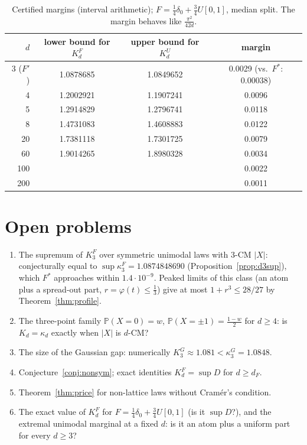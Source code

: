 \documentclass[11pt]{amsart}
\theoremstyle{definition}\newtheorem{definition}[theorem]{Definition}\theoremstyle{remark}\newtheorem{remark}[theorem]{Remark}
\begin{document}
\begin{table}[ht]\centering\small
\begin{tabular}{rccc}\toprule
$d$ & lower bound for $K_d^F$ & upper bound for $K_d^U$ & margin\\\midrule
3 ($F'$) & 1.0878685 & 1.0849652 & 0.0029 (vs.\ $F^*$: 0.00038)\\
4 & 1.2002921 & 1.1907241 & 0.0096\\
5 & 1.2914829 & 1.2796741 & 0.0118\\
8 & 1.4731083 & 1.4608883 & 0.0122\\
20 & 1.7381118 & 1.7301725 & 0.0079\\
60 & 1.9014265 & 1.8980328 & 0.0034\\
100 & & & 0.0022\\
200 & & & 0.0011\\\bottomrule
\end{tabular}
\caption{Certified margins (interval arithmetic); $F=\frac14\delta_0+\frac34U[0,1]$, median split. The margin behaves like $\frac{\pi^2}{42d}$.}\label{tab:margins}
\end{table}

\section{Open problems}\label{sec:open}
\begin{enumerate}
\item The supremum of $K_3^F$ over symmetric unimodal laws with $3$-CM $|X|$: conjecturally equal to $\sup\kappa_3^F=1.0874848690$ (Proposition~\ref{prop:d3sup}), which
$F^*$ approaches within $1.4\cdot10^{-9}$. Peaked limits of this class (an atom plus a spread-out part, $r=\varphi(t)\le\frac13$) give at most $1+r^3\le28/27$ by Theorem~\ref{thm:profile}.
\item The three-point family $\mathbb P(X=0)=w$, $\mathbb P(X=\pm1)=\frac{1-w}2$ for $d\ge4$: is $K_d=\kappa_d$ exactly when $|X|$ is $d$-CM?
\item The size of the Gaussian gap: numerically $K_3^G\approx1.081<\kappa_3^G=1.0848$.
\item Conjecture~\ref{conj:nonsym}; exact identities $K_d^F=\sup D$ for $d\ge d_F$.
\item Theorem~\ref{thm:price} for non-lattice laws without Cram\'er's condition.
\item The exact value of $K_d^F$ for $F=\frac14\delta_0+\frac34U[0,1]$ (is it $\sup D$?), and the extremal unimodal marginal at a fixed $d$: is it an atom plus a uniform
part for every $d\ge3$?
\end{enumerate}
\end{document}
